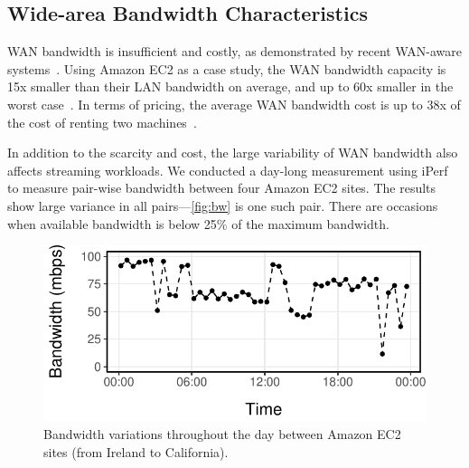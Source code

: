 

\subsection{Wide-area Bandwidth Characteristics}
\label{sec:wide-area-bandwidth}

WAN bandwidth is insufficient and costly, as demonstrated by recent WAN-aware
systems~\cite{pu2015low, vulimiri2015global, vulimiri2015wananlytics,
  hsieh17gaia}. Using Amazon EC2 as a case study, the WAN bandwidth capacity is
15x smaller than their LAN bandwidth on average, and up to 60x smaller in the
worst case~\cite{hsieh17gaia}. In terms of pricing, the average WAN bandwidth
cost is up to 38x of the cost of renting two machines~\cite{amazon2017pricing,
  hsieh17gaia}.

In addition to the scarcity and cost, the large variability of WAN bandwidth
also affects streaming workloads. We conducted a day-long measurement using
iPerf~\cite{iperf3} to measure pair-wise bandwidth between four Amazon EC2
sites. The results show large variance in all pairs---\autoref{fig:bw} is one
such pair. There are occasions when available bandwidth is below 25\% of the
maximum bandwidth.

\begin{figure}
  \centering
  \includegraphics[width=.9\linewidth]{figures/aws-variation.pdf}
  \caption{Bandwidth variations throughout the day between Amazon EC2 sites
    (from Ireland to California).}
  \label{fig:bw}
\end{figure}

